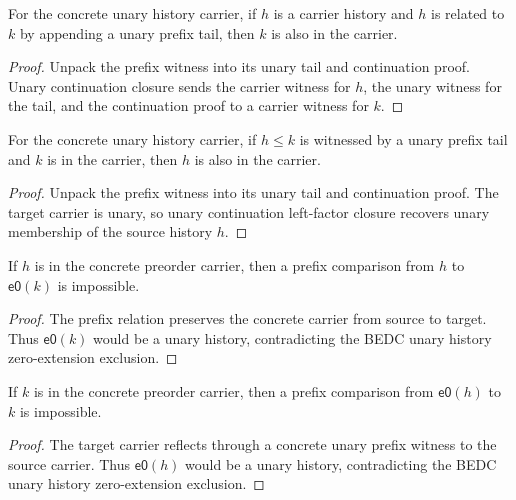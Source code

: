 \begin{theorem}
\label{thm:preorder-prefix-preserves-carrier}
For the concrete unary history carrier, if $h$ is a carrier history and $h$ is related to $k$ by appending a unary prefix tail, then $k$ is also in the carrier.
\end{theorem}
\begin{proof}
Unpack the prefix witness into its unary tail and continuation proof. Unary continuation closure sends the carrier witness for $h$, the unary witness for the tail, and the continuation proof to a carrier witness for $k$.
\end{proof}

\begin{theorem}
\label{thm:preorder-prefix-source-carrier-of-target-carrier}
For the concrete unary history carrier, if \(h\le k\) is witnessed by a unary
prefix tail and \(k\) is in the carrier, then \(h\) is also in the carrier.
\end{theorem}
\begin{proof}
Unpack the prefix witness into its unary tail and continuation proof. The
target carrier is unary, so unary continuation left-factor closure recovers
unary membership of the source history \(h\).
\end{proof}

\begin{theorem}
\label{thm:preorder-prefix-carrier-no-e0-target}
If $h$ is in the concrete preorder carrier, then a prefix comparison from
$h$ to $\mathsf{e0}(k)$ is impossible.
\end{theorem}
\begin{proof}
The prefix relation preserves the concrete carrier from source to target.
Thus $\mathsf{e0}(k)$ would be a unary history, contradicting the BEDC unary
history zero-extension exclusion.
\end{proof}

\begin{theorem}
\label{thm:preorder-prefix-carrier-no-e0-source}
If $k$ is in the concrete preorder carrier, then a prefix comparison from
$\mathsf{e0}(h)$ to $k$ is impossible.
\end{theorem}
\begin{proof}
The target carrier reflects through a concrete unary prefix witness to the
source carrier. Thus $\mathsf{e0}(h)$ would be a unary history, contradicting
the BEDC unary history zero-extension exclusion.
\end{proof}


